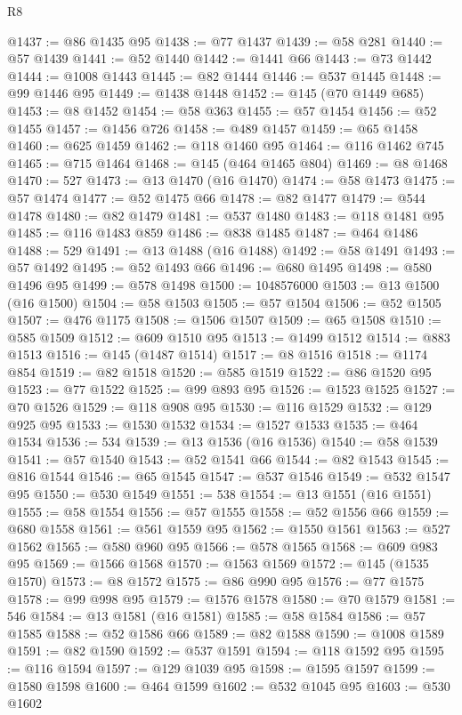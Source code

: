 \begin{lexlean}{R8}
\begin{coremodule}
@1437 := @86 @1435 @95
@1438 := @77 @1437
@1439 := @58 @281
@1440 := @57 @1439
@1441 := @52 @1440
@1442 := @1441 @66
@1443 := @73 @1442
@1444 := @1008 @1443
@1445 := @82 @1444
@1446 := @537 @1445
@1448 := @99 @1446 @95
@1449 := @1438 @1448
@1452 := @145 (@70 @1449 @685)
@1453 := @8 @1452
@1454 := @58 @363
@1455 := @57 @1454
@1456 := @52 @1455
@1457 := @1456 @726
@1458 := @489 @1457
@1459 := @65 @1458
@1460 := @625 @1459
@1462 := @118 @1460 @95
@1464 := @116 @1462 @745
@1465 := @715 @1464
@1468 := @145 (@464 @1465 @804)
@1469 := @8 @1468
@1470 := 527
@1473 := @13 @1470 (@16 @1470)
@1474 := @58 @1473
@1475 := @57 @1474
@1477 := @52 @1475 @66
@1478 := @82 @1477
@1479 := @544 @1478
@1480 := @82 @1479
@1481 := @537 @1480
@1483 := @118 @1481 @95
@1485 := @116 @1483 @859
@1486 := @838 @1485
@1487 := @464 @1486
@1488 := 529
@1491 := @13 @1488 (@16 @1488)
@1492 := @58 @1491
@1493 := @57 @1492
@1495 := @52 @1493 @66
@1496 := @680 @1495
@1498 := @580 @1496 @95
@1499 := @578 @1498
@1500 := 1048576000
@1503 := @13 @1500 (@16 @1500)
@1504 := @58 @1503
@1505 := @57 @1504
@1506 := @52 @1505
@1507 := @476 @1175
@1508 := @1506 @1507
@1509 := @65 @1508
@1510 := @585 @1509
@1512 := @609 @1510 @95
@1513 := @1499 @1512
@1514 := @883 @1513
@1516 := @145 (@1487 @1514)
@1517 := @8 @1516
@1518 := @1174 @854
@1519 := @82 @1518
@1520 := @585 @1519
@1522 := @86 @1520 @95
@1523 := @77 @1522
@1525 := @99 @893 @95
@1526 := @1523 @1525
@1527 := @70 @1526
@1529 := @118 @908 @95
@1530 := @116 @1529
@1532 := @129 @925 @95
@1533 := @1530 @1532
@1534 := @1527 @1533
@1535 := @464 @1534
@1536 := 534
@1539 := @13 @1536 (@16 @1536)
@1540 := @58 @1539
@1541 := @57 @1540
@1543 := @52 @1541 @66
@1544 := @82 @1543
@1545 := @816 @1544
@1546 := @65 @1545
@1547 := @537 @1546
@1549 := @532 @1547 @95
@1550 := @530 @1549
@1551 := 538
@1554 := @13 @1551 (@16 @1551)
@1555 := @58 @1554
@1556 := @57 @1555
@1558 := @52 @1556 @66
@1559 := @680 @1558
@1561 := @561 @1559 @95
@1562 := @1550 @1561
@1563 := @527 @1562
@1565 := @580 @960 @95
@1566 := @578 @1565
@1568 := @609 @983 @95
@1569 := @1566 @1568
@1570 := @1563 @1569
@1572 := @145 (@1535 @1570)
@1573 := @8 @1572
@1575 := @86 @990 @95
@1576 := @77 @1575
@1578 := @99 @998 @95
@1579 := @1576 @1578
@1580 := @70 @1579
@1581 := 546
@1584 := @13 @1581 (@16 @1581)
@1585 := @58 @1584
@1586 := @57 @1585
@1588 := @52 @1586 @66
@1589 := @82 @1588
@1590 := @1008 @1589
@1591 := @82 @1590
@1592 := @537 @1591
@1594 := @118 @1592 @95
@1595 := @116 @1594
@1597 := @129 @1039 @95
@1598 := @1595 @1597
@1599 := @1580 @1598
@1600 := @464 @1599
@1602 := @532 @1045 @95
@1603 := @530 @1602

\end{coremodule}
\end{lexlean}
